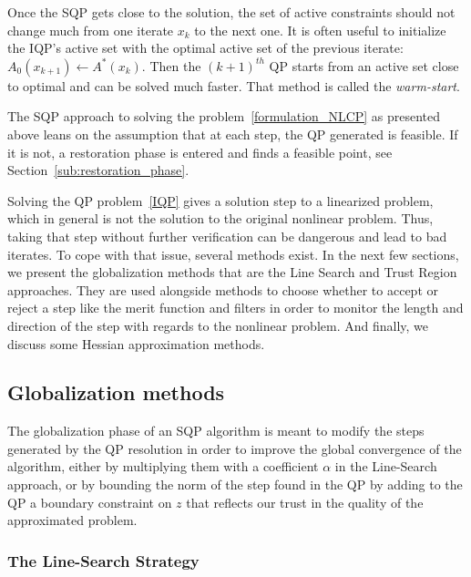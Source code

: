 Once the SQP gets close to the solution, the set of active constraints should not change much from one iterate $x_k$ to the next one.
It is often useful to initialize the IQP's active set with the optimal active set of the previous iterate: $\mathit{A}_0(x_{k+1})\leftarrow\mathit{A}^*(x_k)$. Then the ${(k+1)}^{th}$ QP starts from an active set close to optimal and can be solved much faster.
That method is called the \textit{warm-start}.

The SQP approach to solving the problem~\ref{formulation_NLCP} as presented above leans on the assumption that at each step, the QP generated is feasible.
If it is not, a restoration phase is entered and finds a feasible point, see Section~\ref{sub:restoration_phase}.

Solving the QP problem~\ref{IQP} gives a solution step to a linearized problem, which in general is not the solution to the original nonlinear problem.
Thus, taking that step without further verification can be dangerous and lead to bad iterates.
To cope with that issue, several methods exist.
In the next few sections, we present the globalization methods that are the Line Search and Trust Region approaches.
They are used alongside methods to choose whether to accept or reject a step like the merit function and filters in order to monitor the length and direction of the step with regards to the nonlinear problem.
And finally, we discuss some Hessian approximation methods.

\subsection{Globalization methods}
\label{sub:globalization_methods}

The globalization phase of an SQP algorithm is meant to modify the steps generated by the QP resolution in order to improve the global convergence of the algorithm, either by multiplying them with a coefficient $\alpha$ in the Line-Search approach, or by bounding the norm of the step found in the QP by adding to the QP a boundary constraint on $z$ that reflects our trust in the quality of the approximated problem.

\subsubsection{The Line-Search Strategy}
\label{ssub:line_search}


